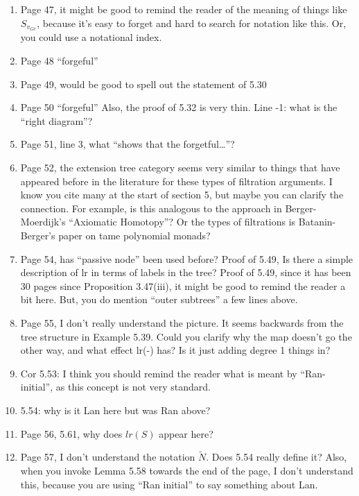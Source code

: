 \documentclass{article}
\begin{document}
\begin{enumerate}
\item
Page 47, it might be good to remind the reader of the meaning of things like $S_{v_{G e}}$, because it's easy to forget and hard to search for notation like this. Or, you could use a notational index.


\item
Page 48 ``forgeful''

\item
Page 49, would be good to spell out the statement of 5.30

\item
Page 50 ``forgeful''
Also, the proof of 5.32 is very thin.
Line -1: what is the ``right diagram''?

\item
Page 51, line 3, what ``shows that the forgetful\dots''?

\item
Page 52, the extension tree category seems very similar to things that have appeared before in the literature for these types of filtration arguments. I know you cite many at the start of section 5, but maybe you can clarify the connection. For example, is this analogous to the approach in Berger-Moerdijk's ``Axiomatic Homotopy''? Or the types of filtrations is Batanin-Berger's paper on tame polynomial monads?

\item
Page 54, has ``passive node'' been used before?
Proof of 5.49, Is there a simple description of lr in terms of labels in the tree?
Proof of 5.49, since it has been 30 pages since Proposition 3.47(iii), it might be good to remind the reader a bit here. But, you do mention ``outer subtrees'' a few lines above.

\item
Page 55, I don't really understand the picture. It seems backwards from the tree structure in Example 5.39. Could you clarify why the map doesn't go the other way, and what effect lr(-) has? Is it just adding degree 1 things in?

\item
Cor 5.53: I think you should remind the reader what is meant by ``Ran-initial'', as this concept is not very standard.

\item
5.54: why is it Lan here but was Ran above?

\item
Page 56, 5.61, why does $lr(S)$ appear here?


\item
Page 57, I don't understand the notation $\tilde{N}$. Does 5.54 really define it?
Also, when you invoke Lemma 5.58 towards the end of the page, I don't understand this, because you are using ``Ran initial'' to say something about Lan.


\end{enumerate}
\end{document}
